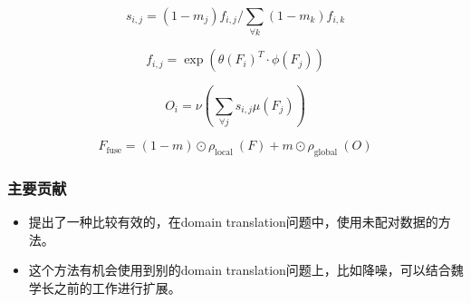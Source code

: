 \documentclass[10pt]{article}
\begin{document}
\[s_{i, j}=\left(1-m_{j}\right) f_{i, j} / \sum_{\forall k}\left(1-m_{k}\right) f_{i, k}\]

\[f_{i, j}=\exp \left(\theta\left(F_{i}\right)^{T} \cdot \phi\left(F_{j}\right)\right)\]

\[O_{i}=\nu\left(\sum_{\forall j} s_{i, j} \mu\left(F_{j}\right)\right)\]

\[F_{\text {fuse}}=(1-m) \odot \rho_{\text {local }}(F)+m \odot \rho_{\text {global }}(O)\]

\subsubsection{主要贡献}

\begin{itemize}
\item
  提出了一种比较有效的，在domain
  translation问题中，使用未配对数据的方法。
\item
  这个方法有机会使用到别的domain
  translation问题上，比如降噪，可以结合魏学长之前的工作进行扩展。
\end{itemize}

\printbibliography
\end{document}
